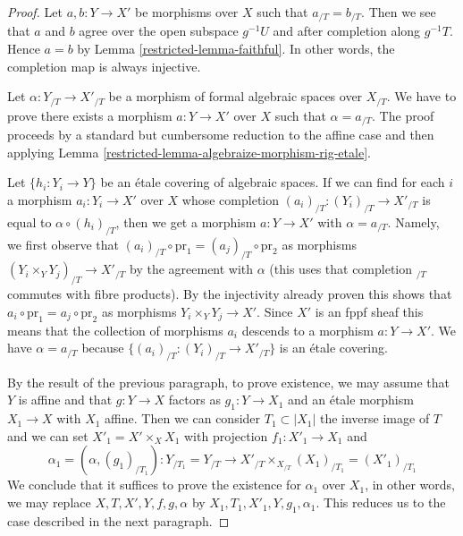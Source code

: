 \begin{proof}

Let $a, b : Y \to X'$ be morphisms over $X$ such that
$a_{/T} = b_{/T}$. Then we see that $a$ and $b$ agree over the open
subspace $g^{-1}U$ and after completion along $g^{-1}T$.
Hence $a = b$ by Lemma \ref{restricted-lemma-faithful}.
In other words, the completion map is always injective.

\medskip\noindent
Let $\alpha : Y_{/T} \to X'_{/T}$ be a morphism of formal algebraic spaces
over $X_{/T}$. We have to prove there exists a morphism $a : Y \to X'$
over $X$ such that $\alpha = a_{/T}$. The proof proceeds by a standard
but cumbersome reduction to the affine case and then applying
Lemma \ref{restricted-lemma-algebraize-morphism-rig-etale}.

\medskip\noindent
Let $\{h_i : Y_i \to Y\}$ be an \'etale covering of algebraic spaces.
If we can find for each $i$ a morphism $a_i : Y_i \to X'$ over $X$
whose completion $(a_i)_{/T} : (Y_i)_{/T} \to X'_{/T}$ is equal to
$\alpha \circ (h_i)_{/T}$, then we get a morphism $a : Y \to X'$
with $\alpha = a_{/T}$. Namely, we first observe that
$(a_i)_{/T} \circ \text{pr}_1 = (a_j)_{/T} \circ \text{pr}_2$
as morphisms $(Y_i \times_Y Y_j)_{/T} \to X'_{/T}$ by the
agreement with $\alpha$ (this uses that completion ${}_{/T}$ commutes
with fibre products). By the injectivity already proven this shows that
$a_i \circ \text{pr}_1 = a_j \circ \text{pr}_2$ as morphisms
$Y_i \times_Y Y_j \to X'$. Since $X'$ is an fppf sheaf this means that
the collection of morphisms $a_i$ descends to a morphism $a : Y \to X'$.
We have $\alpha = a_{/T}$ because $\{(a_i)_{/T} : (Y_i)_{/T} \to X'_{/T}\}$
is an \'etale covering.

\medskip\noindent
By the result of the previous paragraph, to prove existence,
we may assume that $Y$ is affine and that $g : Y \to X$ factors
as $g_1 : Y \to X_1$ and an \'etale morphism $X_1 \to X$ with $X_1$ affine.
Then we can consider $T_1 \subset |X_1|$ the inverse image of $T$
and we can set $X'_1 = X' \times_X X_1$ with projection $f_1 : X'_1 \to X_1$
and
$$
\alpha_1 = (\alpha, (g_1)_{/T_1}) :
Y_{/T_1} = Y_{/T}
\longrightarrow
X'_{/T} \times_{X_{/T}} (X_1)_{/T_1} = (X'_1)_{/T_1}
$$
We conclude that it suffices to prove the existence for $\alpha_1$
over $X_1$, in other words, we may replace $X, T, X', Y, f, g, \alpha$
by $X_1, T_1, X'_1, Y, g_1, \alpha_1$.
This reduces us to the case described in the next paragraph.


\end{proof}
